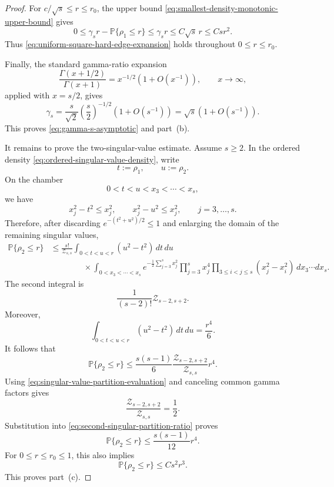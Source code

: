 \documentclass[11pt]{article}
\newcommand{\Pbb}{\mathbb P}
\newcommand{\1}{\mathbf 1}
\begin{document}
\begin{proof}
For \(c/\sqrt{s}\le r\le r_0\), the upper bound
\eqref{eq:smallest-density-monotonic-upper-bound} gives
\[
        0
        \le
        \gamma_s r-\Pbb\{\rho_1\le r\}
        \le
        \gamma_s r
        \le
        C\sqrt{s}\,r
        \le
        Csr^2.
\]
Thus \eqref{eq:uniform-square-hard-edge-expansion} holds throughout
\(0\le r\le r_0\).

Finally, the standard gamma-ratio expansion
\[
        \frac{\Gamma(x+1/2)}{\Gamma(x+1)}
        =
        x^{-1/2}\left(1+O(x^{-1})\right),
        \qquad x\to\infty,
\]
applied with \(x=s/2\), gives
\[
        \gamma_s
        =
        \frac{s}{\sqrt2}
        \left(\frac{s}{2}\right)^{-1/2}
        \left(1+O(s^{-1})\right)
        =
        \sqrt{s}\left(1+O(s^{-1})\right).
\]
This proves \eqref{eq:gamma-s-asymptotic} and part~(b).

It remains to prove the two-singular-value estimate.  Assume \(s\ge2\).  In the ordered
density \eqref{eq:ordered-singular-value-density}, write
\[
        t:=\rho_1,
        \qquad
        u:=\rho_2.
\]
On the chamber
\[
        0<t<u<x_3<\cdots<x_s,
\]
we have
\[
        x_j^2-t^2\le x_j^2,
        \qquad
        x_j^2-u^2\le x_j^2,
        \qquad j=3,\ldots,s.
\]
Therefore, after discarding \(e^{-(t^2+u^2)/2}\le1\) and enlarging the domain of the
remaining singular values,
\begin{align}
        \Pbb\{\rho_2\le r\}
        &\le
        \frac{s!}{\mathcal Z_{s,s}}
        \int_{0<t<u<r}(u^2-t^2)\,dt\,du
\nonumber\\
        &\qquad\qquad\times
        \int_{0<x_3<\cdots<x_s}
        e^{-\frac12\sum_{j=3}^s x_j^2}
        \prod_{j=3}^s x_j^4
        \prod_{3\le i<j\le s}(x_j^2-x_i^2)
        \,dx_3\cdots dx_s.
        \label{eq:second-singular-partition-bound}
\end{align}
The second integral is
\[
        \frac{1}{(s-2)!}\mathcal Z_{s-2,s+2}.
\]
Moreover,
\[
        \int_{0<t<u<r}(u^2-t^2)\,dt\,du
        =
        \frac{r^4}{6}.
\]
It follows that
\begin{equation}
        \Pbb\{\rho_2\le r\}
        \le
        \frac{s(s-1)}{6}
        \frac{\mathcal Z_{s-2,s+2}}{\mathcal Z_{s,s}}
        r^4.
        \label{eq:second-singular-partition-ratio}
\end{equation}
Using \eqref{eq:singular-value-partition-evaluation} and canceling common gamma factors gives
\begin{equation}
        \frac{\mathcal Z_{s-2,s+2}}{\mathcal Z_{s,s}}
        =
        \frac12.
        \label{eq:second-singular-partition-ratio-value}
\end{equation}
Substitution into \eqref{eq:second-singular-partition-ratio} proves
\[
        \Pbb\{\rho_2\le r\}
        \le
        \frac{s(s-1)}{12}r^4.
\]
For \(0\le r\le r_0\le1\), this also implies
\[
        \Pbb\{\rho_2\le r\}
        \le
        Cs^2r^3.
\]
This proves part~(c).
\end{proof}
\end{document}

